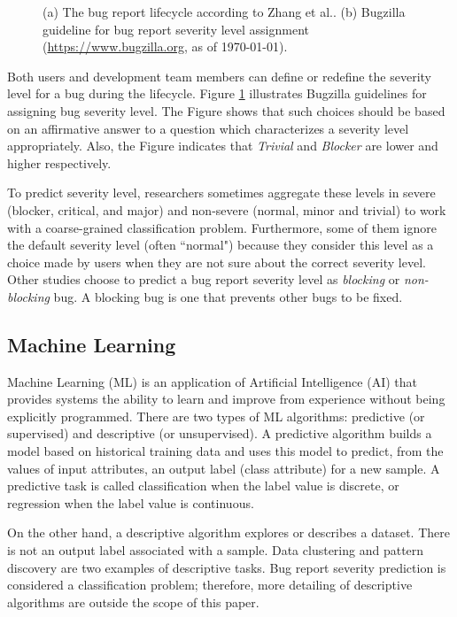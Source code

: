\begin{figure}[!htp]
\begin{subfigure}{.40\textwidth}
    \caption{} 
    \label{fig:bug-report-severity-level-guideline}
  \end{subfigure}
  \caption{(a) The bug report lifecycle according to Zhang et al.\cite{Zhang:2015}. (b) Bugzilla guideline for bug report severity level assignment (\url{https://www.bugzilla.org}, as of \today).}
  \label{fig:bug-report-life-cycle-and-severity-level-guideline}
\end{figure}

Both users and development team members can define or redefine the severity level for a bug during the lifecycle. Figure \ref{fig:bug-report-severity-level-guideline} illustrates Bugzilla guidelines for assigning bug severity level. The Figure shows that such choices should be based on an affirmative answer to a question which characterizes a severity level appropriately. Also, the Figure indicates that \textit{Trivial} and \textit{Blocker} are lower and higher respectively.

To predict severity level, researchers sometimes aggregate these levels in severe (blocker, critical, and major) and non-severe (normal, minor and trivial) to work with a coarse-grained classification problem. Furthermore, some of them ignore the default severity level (often ``normal") because they consider this level as a choice made by users when they are not sure about the correct severity level. Other studies choose to predict a bug report severity level as \textit{blocking} or \textit{non-blocking} bug. A blocking bug is one that prevents other bugs to be fixed\cite{Valdivia:2014}. 

\subsection{Machine Learning}
Machine Learning (ML)\cite{Flach:2012} is an application of Artificial Intelligence (AI) that provides systems the ability to learn and improve from experience without being explicitly programmed. There are two types of ML algorithms: predictive (or supervised) and descriptive (or unsupervised). A predictive algorithm builds a model based on historical training data and uses this model to predict, from the values of input attributes, an output label (class attribute) for a new sample. A predictive task is called classification when the label value is discrete, or regression when the label value is continuous. 

On the other hand, a descriptive algorithm explores or describes a dataset. There is not an output label associated with a sample. Data clustering and pattern discovery are two examples of descriptive tasks. Bug report severity prediction is considered a classification problem; therefore, more detailing of descriptive algorithms are outside the scope of this paper.


